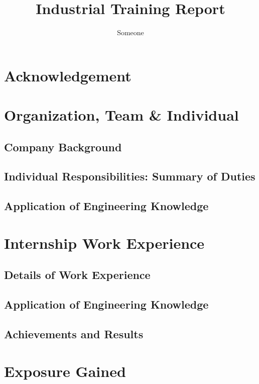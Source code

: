 \documentclass[12pt]{article}
\title{Industrial Training Report}
\author{Someone}
\begin{document}
\maketitle

\section*{Acknowledgement}

\clearpage

\tableofcontents

\clearpage

\section{Organization, Team \& Individual}
\subsection{Company Background}    
\subsection{Individual Responsibilities: Summary of Duties}
\subsection{Application of Engineering Knowledge}

\clearpage

\section{Internship Work Experience}
\subsection{Details of Work Experience}
\subsection{Application of Engineering Knowledge}
\subsection{Achievements and Results}

\clearpage

\section{Exposure Gained}
\end{document}
